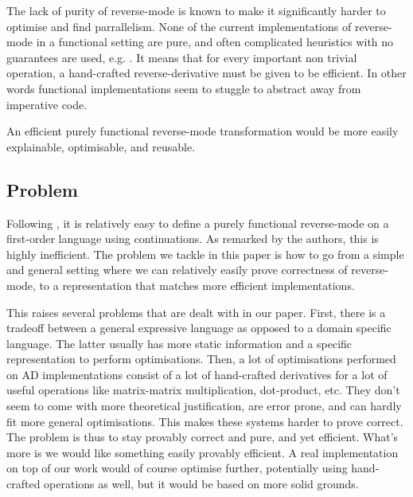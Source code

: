 The lack of purity of reverse-mode is known to make it significantly harder to optimise and find parrallelism. 
None of the current implementations of reverse-mode in a functional setting \cite{lantern_icfp,pearlmutter2008reverse,baydin2016diffsharp} are pure, and often complicated heuristics with no guarantees are used, e.g. \cite{xla}.
It means that for every important non trivial operation, a hand-crafted reverse-derivative must be given to be efficient.
In other words functional implementations seem to stuggle to abstract away from imperative code.

 An efficient purely functional reverse-mode transformation would be more easily explainable, optimisable, and reusable.

 \subsection{Problem}

Following \cite{pearlmutter2008reverse}, it is relatively easy to define a purely functional reverse-mode on a first-order language using continuations. 
As remarked by the authors, this is highly inefficient. 
The problem we tackle in this paper is how to go from a simple and general setting where we can relatively easily prove correctness of reverse-mode, 
to a representation that matches more efficient implementations.

This raises several problems that are dealt with in our paper. First, there is a tradeoff between a general expressive language 
as opposed to a domain specific language. The latter usually has more static information and a specific representation to perform optimisations.
Then, a lot of optimisations performed on AD implementations consist of a lot of hand-crafted derivatives for a lot of useful operations like matrix-matrix multiplication, dot-product, etc.
They don't seem to come with more theoretical justification, are error prone, and can hardly fit more general optimisations.
This makes these systems harder to prove correct. The problem is thus to stay provably correct and pure, and yet efficient. What's more is we would like something easily provably efficient. 
A real implementation on top of our work would of course optimise further, potentially using hand-crafted operations as well, but it would be based on more solid grounds.


